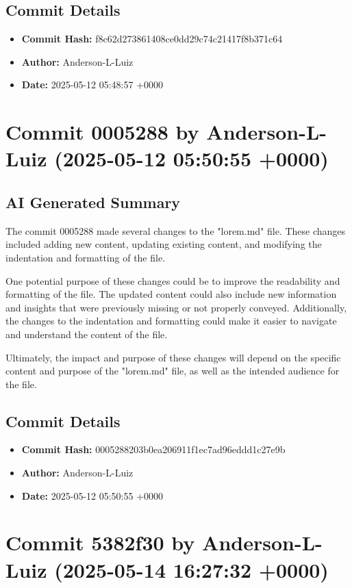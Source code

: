 \documentclass{article}
\begin{document}
\subsection{Commit Details}
\begin{itemize}
    \item \textbf{Commit Hash:} f8c62d273861408ce0dd29c74c21417f8b371c64
    \item \textbf{Author:} Anderson-L-Luiz
    \item \textbf{Date:} 2025-05-12 05:48:57 +0000
\end{itemize}
\hrulefill

\section{Commit 0005288 by Anderson-L-Luiz (2025-05-12 05:50:55 +0000)}
\subsection{AI Generated Summary}
{\selectfont
 The commit 0005288 made several changes to the "lorem.md" file. These changes included adding new content, updating existing content, and modifying the indentation and formatting of the file.

One potential purpose of these changes could be to improve the readability and formatting of the file. The updated content could also include new information and insights that were previously missing or not properly conveyed. Additionally, the changes to the indentation and formatting could make it easier to navigate and understand the content of the file.

Ultimately, the impact and purpose of these changes will depend on the specific content and purpose of the "lorem.md" file, as well as the intended audience for the file.
}
\subsection{Commit Details}
\begin{itemize}
    \item \textbf{Commit Hash:} 0005288203b0ea206911f1ec7ad96eddd1c27e9b
    \item \textbf{Author:} Anderson-L-Luiz
    \item \textbf{Date:} 2025-05-12 05:50:55 +0000
\end{itemize}
\hrulefill

\section{Commit 5382f30 by Anderson-L-Luiz (2025-05-14 16:27:32 +0000)}
\end{document}
